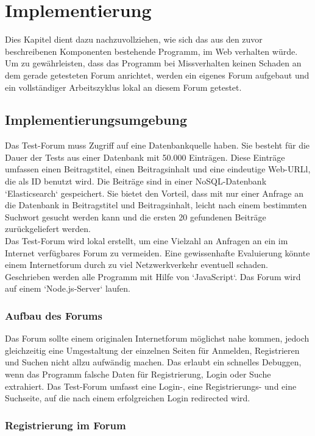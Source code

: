 \section{Implementierung}
Dies Kapitel dient dazu nachzuvollziehen, wie sich das aus den zuvor beschreibenen Komponenten bestehende Programm, im Web verhalten würde. Um zu gewährleisten, dass das Programm bei Missverhalten keinen Schaden an dem gerade getesteten Forum anrichtet, werden ein eigenes Forum aufgebaut und ein vollständiger Arbeitszyklus lokal an diesem Forum getestet.

\subsection{Implementierungsumgebung}
Das Test-Forum muss Zugriff auf eine Datenbankquelle haben. Sie  besteht für die Dauer der Tests aus einer Datenbank mit 50.000 Einträgen. Diese Einträge umfassen einen Beitragstitel, einen Beitragsinhalt und eine eindeutige Web-URLl, die als ID benutzt wird. Die Beiträge sind in einer NoSQL-Datenbank `Elasticsearch` gespeichert. Sie bietet den Vorteil, dass mit nur einer Anfrage an die Datenbank in Beitragstitel und Beitragsinhalt, leicht nach einem bestimmten Suchwort gesucht werden kann und die ersten 20 gefundenen Beiträge zurückgeliefert werden.\\
Das Test-Forum wird lokal erstellt, um eine Vielzahl an Anfragen an ein im Internet verfügbares Forum zu vermeiden. Eine gewissenhafte Evaluierung könnte einem Internetforum durch zu viel Netzwerkverkehr eventuell schaden.\\
Geschrieben werden alle Programm mit Hilfe von `JavaScript`. Das Forum wird auf einem `Node.js-Server` laufen. 

\subsubsection{Aufbau des Forums}
Das Forum sollte einem originalen Internetforum möglichst nahe kommen, jedoch gleichzeitig eine Umgestaltung der einzelnen Seiten für Anmelden, Registrieren und Suchen nicht allzu aufwändig machen. Das erlaubt ein schnelles Debuggen, wenn das Programm falsche Daten für Registrierung, Login oder Suche extrahiert. Das Test-Forum umfasst eine Login-, eine Registrierungs- und eine Suchseite, auf die nach einem erfolgreichen Login redirected wird.

\subsubsection{Registrierung im Forum}


